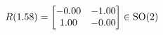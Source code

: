 \documentclass[preview]{standalone}
\begin{document}
\begin{align*}
\special{dvisvgm:raw <g id='unique000'>}R(1.58) = \begin{bmatrix} -0.00 & -1.00 \\ 1.00 & -0.00 \end{bmatrix} \in \text{SO}(2)\special{dvisvgm:raw </g>}
\end{align*}
\end{document}
